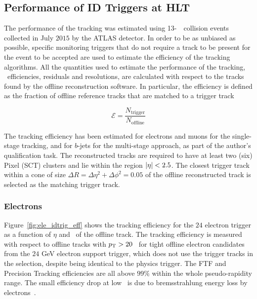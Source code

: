 			\subsection{Performance of ID Triggers at HLT}
			\label{sec:Trig_perf}

				The performance of the tracking was estimated using 13-\TeV\ \pp\ collision events collected in July $2015$ by the \ac{ATLAS} detector. In order to be as unbiased as possible, specific monitoring triggers that do not require a track to be present for the event to be accepted are used to estimate the efficiency of the tracking algorithms. All the quantities used to estimate the performance of the tracking, \ie\ efficiencies, residuals and resolutions, are calculated with respect to the tracks found by the offline reconstruction software. In particular, the efficiency is defined as the fraction of offline reference tracks that are matched to a trigger track 

				\begin{equation}
					\mathcal{E} = \frac{N_{\mathrm{trigger}}}{N_{\mathrm{offline}}}
					\label{eq:trig_eff}
				\end{equation}

				The tracking efficiency has been estimated for electrons and muons for the single-stage tracking, and for $b$-jets for the multi-stage approach, as part of the author's qualification task. The reconstructed tracks are required to have at least two (six) Pixel (\ac{SCT}) clusters and lie within the region $|\eta| < 2.5$. The closest trigger track within a cone of size $\Delta R =  \Delta \eta^2 + \Delta \phi^2 = 0.05$ of the offline reconstructed track is selected as the matching trigger track.


				\subsubsection*{Electrons}

					Figure~\ref{fig:ele_idtrig_eff} shows the tracking efficiency for the $24$ \GeV electron trigger as a function of $\eta$ and \pt\ of the offline track. The tracking efficiency is measured with respect to offline tracks with $p_{\mathrm{T}} > 20$ \GeV\ for tight offline electron candidates from the $24$ GeV electron support trigger, which does not use the trigger tracks in the selection, despite being identical to the physics trigger. The \ac{FTF} and Precision Tracking efficiencies are all above $99\%$ within the whole pseudo-rapidity range. The small efficiency drop at low \pt\ is due to bremsstrahlung energy loss by electrons~\cite{ATLASTrigger2015}.

